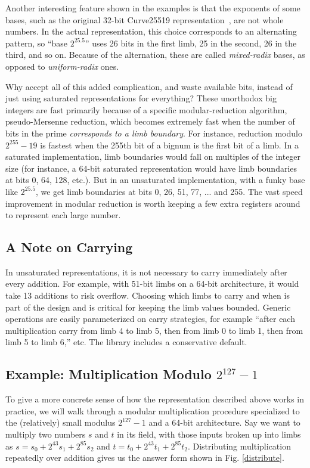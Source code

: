 \documentclass[letterpaper,twocolumn,10pt]{article}
\begin{document}
Another interesting feature shown in the examples is that the exponents of some
bases, such as the original 32-bit Curve25519 representation~\cite{curve25519}, are not whole numbers.
In the actual representation, this choice corresponds to an alternating pattern, so ``base $2^{25.5}$'' uses 26 bits in the first limb, 25 in the second, 26 in the third, and so on.
Because of the alternation, these are called \emph{mixed-radix} bases, as opposed to \emph{uniform-radix} ones.

Why accept all of this added complication, and waste available bits, instead of just using saturated representations for everything?
These unorthodox big integers are fast primarily because of a specific modular-reduction algorithm, pseudo-Mersenne reduction, which becomes extremely fast when the number of bits in the prime \emph{corresponds to a limb boundary}.
For instance, reduction modulo $2^{255}-19$ is fastest when the 255th bit of a bignum is the first bit of a limb.
In a saturated implementation, limb boundaries would fall on multiples of the integer size (for instance, a 64-bit saturated representation would have limb boundaries at bits 0, 64, 128, etc.).
But in an unsaturated implementation, with a funky base like $2^{25.5}$, we get limb boundaries at bits 0, 26, 51, 77, ... and 255.
The vast speed improvement in modular reduction is worth keeping a few extra registers around to represent each large number.

\subsection{A Note on Carrying}

In unsaturated representations, it is not necessary to carry immediately after every addition.
For example, with 51-bit limbs on a 64-bit architecture, it would take 13 additions to risk overflow.
Choosing which limbs to carry and when is part of the design and is critical for keeping the limb values bounded.
Generic operations are easily parameterized on carry strategies, for example ``after each multiplication carry from limb 4 to limb 5, then from limb 0 to limb 1, then from limb 5 to limb 6,'' etc.
The library includes a conservative default.

\subsection{Example: Multiplication Modulo $2^{127}-1$}

To give a more concrete sense of how the representation described above works in practice, we will walk through a modular multiplication procedure specialized to the (relatively) small modulus $2^{127} - 1$ and a 64-bit architecture.
Say we want to multiply two numbers $s$ and $t$ in its field, with those inputs broken up into limbs as $s = s_0 + 2^{43} s_1 + 2^{85} s_2$ and $t = t_0 + 2^{43} t_1 + 2^{85} t_2$.
Distributing multiplication repeatedly over addition gives us the answer form shown in Fig. \ref{distribute}.
\end{document}
